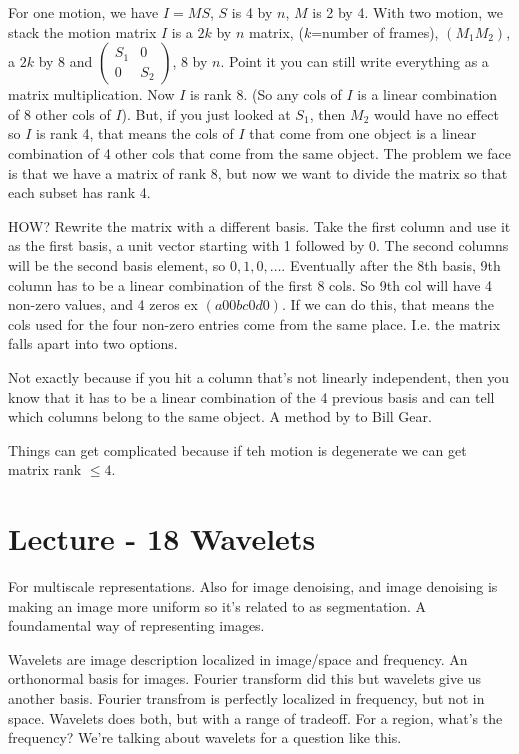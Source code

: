For one motion, we have $I = MS$, $S$ is 4 by $n$, $M$ is 2 by 4. With
two motion, we stack the motion matrix $I$ is a $2k$ by $n$ matrix,
($k$=number of frames), $(M_1 M_2)$, a $2k$ by $8$ and $
(\begin{smallmatrix}
S_1 & 0   \\
0 & S_2
\end{smallmatrix})$, $8$ by $n$.
Point it you can still write everything as a matrix
multiplication. Now $I$ is rank 8. (So any cols of $I$ is a linear
combination of 8 other cols of $I$). But, if you just looked at $S_1$,
then $M_2$  would have no effect so $I$ is rank 4, that means the cols
of $I$ that come from one object is a linear combination of 4 other
cols that come from the same object. The problem we face is that we
have a matrix of rank 8, but now we want to divide the matrix so that
each subset has rank 4. 

HOW?
Rewrite the matrix with a different basis. 
Take the first column and use it as the first basis, a unit vector
starting with 1 followed by 0. The second columns will be the second
basis element, so $0, 1, 0, \dots$. Eventually after the 8th basis,
9th column has to be a linear combination of the first 8 cols. So 9th
col will have 4 non-zero values, and 4 zeros ex $(a 0 0 b c 0 d 0
)$. If we can do this, that means the cols used for the four non-zero entries come from the
same place. I.e. the matrix falls apart into two options.

Not exactly because if you hit a column that's not linearly
independent, then you know that it has  to be a linear combination of
the 4 previous basis and can tell which columns belong to the same
object. A method by to Bill Gear.

Things can get complicated because if teh motion is degenerate we can
get matrix rank $\le 4$. 
\pagebreak

\section{Lecture - 18 Wavelets}
\label{sec:lecture-18}
For multiscale representations. Also for image denoising, and image
denoising is making an image more uniform so it's related to as
segmentation. A foundamental way of representing images.

Wavelets are image description localized in image/space and frequency. An
orthonormal basis for images. Fourier transform did this but wavelets
give us another basis. Fourier transfrom is perfectly localized in
frequency, but not in space. Wavelets does both, but with a range of
tradeoff. For a region, what's the frequency? We're talking about
wavelets for a question like this.

